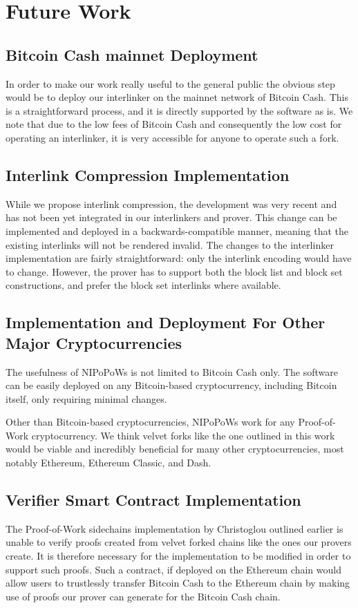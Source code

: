 \section{Future Work}
\subsection{Bitcoin Cash mainnet Deployment}
In order to make our work really useful to the general public the obvious step would be to deploy our interlinker on the mainnet network of Bitcoin Cash. This is a straightforward process, and it is directly supported by the software as is. We note that due to the low fees of Bitcoin Cash and consequently the low cost for operating an interlinker, it is very accessible for anyone to operate such a fork.

\subsection{Interlink Compression Implementation}
While we propose interlink compression, the development was very recent and has not been yet integrated in our interlinkers and prover. This change can be implemented and deployed in a backwards-compatible manner, meaning that the existing interlinks will not be rendered invalid. The changes to the interlinker implementation are fairly straightforward: only the interlink encoding would have to change. However, the prover has to support both the block list and block set constructions, and prefer the block set interlinks where available.

\subsection{Implementation and Deployment For Other Major Cryptocurrencies}
The usefulness of NIPoPoWs is not limited to Bitcoin Cash only. The software can be easily deployed on any Bitcoin-based cryptocurrency, including Bitcoin itself, only requiring minimal changes.

Other than Bitcoin-based cryptocurrencies, NIPoPoWs work for any Proof-of-Work cryptocurrency. We think velvet forks like the one outlined in this work would be viable and incredibly beneficial for many other cryptocurrencies, most notably Ethereum, Ethereum Classic, and Dash.

\subsection{Verifier Smart Contract Implementation}
The Proof-of-Work sidechains implementation by Christoglou \cite{christoglou} outlined earlier is unable to verify proofs created from velvet forked chains like the ones our provers create. It is therefore necessary for the implementation to be modified in order to support such proofs. Such a contract, if deployed on the Ethereum chain would allow users to trustlessly transfer Bitcoin Cash to the Ethereum chain by making use of proofs our prover can generate for the Bitcoin Cash chain.
